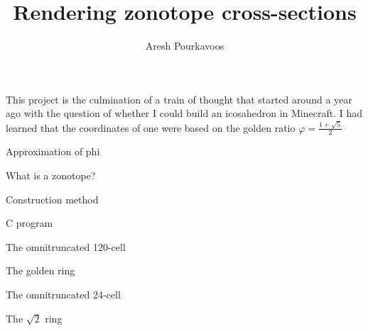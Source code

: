 \documentclass{article}
\begin{document}
\title{Rendering zonotope cross-sections}
\author{Aresh Pourkavoos}
\maketitle

This project is the culmination of a train of thought
that started around a year ago
with the question of whether I could build an icosahedron in Minecraft.
I had learned that the coordinates of one were based on the golden ratio
$\varphi = \frac{1+\sqrt{5}}{2}$

Approximation of phi

What is a zonotope?

Construction method

C program

The omnitruncated 120-cell

The golden ring

The omnitruncated 24-cell

The $\sqrt{2}$ ring
\end{document}
